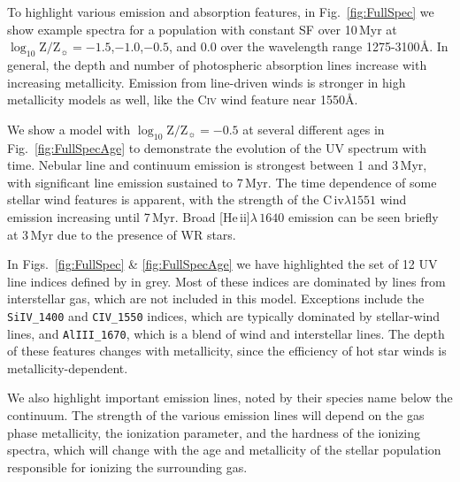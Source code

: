 \documentclass[preprint2,trackchanges]{aastex62}
\newcommand{\heii}{[He\,{\sc ii}]\xspace}
\newcommand{\civ}{C\,{\sc iv}\xspace}
\newcommand{\Myr}{$\,$Myr\xspace}
\newcommand{\logten}{\ensuremath{\log_{10}}}
\newcommand{\logZeq}[1]{\ensuremath{\logten \mathrm{Z}/\mathrm{Z}_{\sun} = #1}}
\newcommand{\ang}{\ensuremath{\mbox{\AA}}\xspace}
\begin{document}
To highlight various emission and absorption features, in Fig.~\ref{fig:FullSpec} we show example spectra for a population with constant SF over 10\Myr at \logZeq{-1.5},$-1.0$,$-0.5$, and $0.0$ over the wavelength range 1275-3100\ang. In general, the depth and number of photospheric absorption lines increase with increasing metallicity. Emission from line-driven winds is stronger in high metallicity models as well, like the  C\textsc{iv} wind feature near 1550\ang.

We show a model with \logZeq{-0.5} at several different ages in Fig.~\ref{fig:FullSpecAge} to demonstrate the evolution of the UV spectrum with time. Nebular line and continuum emission is strongest between 1 and 3\Myr, with significant line emission sustained to 7\Myr. The time dependence of some stellar wind features is apparent, with the strength of the \civ $\lambda1551$ wind emission increasing until 7\Myr. Broad \heii$\lambda\,1640$ emission can be seen briefly at 3\Myr due to the presence of WR stars.

In Figs.~\ref{fig:FullSpec} \& \ref{fig:FullSpecAge} we have highlighted the set of 12 UV line indices defined by \citet{Leitherer+2011} in grey. Most of these indices are dominated by lines from interstellar gas, which are not included in this model. Exceptions include the {\tt SiIV\_1400} and {\tt CIV\_1550} indices, which are typically dominated by stellar-wind lines, and {\tt AlIII\_1670}, which is a blend of wind and interstellar lines. The depth of these features changes with metallicity, since the efficiency of hot star winds is metallicity-dependent.

We also highlight important emission lines, noted by their species name below the continuum. The strength of the various emission lines will depend on the gas phase metallicity, the ionization parameter, and the hardness of the ionizing spectra, which will change with the age and metallicity of the stellar population responsible for ionizing the surrounding gas.
\end{document}
